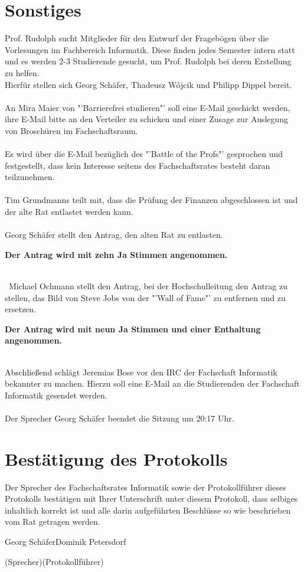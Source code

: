 \documentclass[a4paper, 11pt]{article} %
\newcommand{\TeXer}{Dominik Petersdorf}
\newcommand{\fsiPresident}{Georg Schäfer}
\begin{document}
\section{Sonstiges}

Prof. Rudolph sucht Mitglieder für den Entwurf der Fragebögen über die Vorlesungen im Fachbereich Informatik. 
Diese finden jedes Semester intern statt und es werden 2-3 Studierende gesucht, um Prof. Rudolph bei deren Erstellung zu helfen.
\\
Hierfür stellen sich Georg Schäfer, Thadeusz W{\'o}jcik und Philipp Dippel bereit.
\\\\
An Mira Maier von "'Barrierefrei studieren"' soll eine E-Mail geschickt werden, ihre E-Mail bitte an den Verteiler zu schicken und einer Zusage zur Auslegung von Broschüren im Fachschaftsraum.
\\\\
Es wird über die E-Mail bezüglich des "'Battle of the Profs"' gesprochen und festgestellt, dass kein Interesse seitens des Fachschaftsrates besteht daran teilzunehmen.
\\\\
Tim Grundmanns teilt mit, dass die Prüfung der Finanzen abgeschlossen ist und der alte Rat entlastet werden kann.
\\\\
Georg Schäfer stellt den Antrag, den alten Rat zu entlasten.

\begin{center}
	\textbf{Der Antrag wird mit zehn Ja Stimmen angenommen.}
\end{center}

\ \\\
Michael Ochmann stellt den Antrag, bei der Hochschulleitung den Antrag zu stellen, das Bild von Steve Jobs von der "'Wall of Fame"' zu entfernen und zu ersetzen.

\begin{center}
	\textbf{Der Antrag wird mit neun Ja Stimmen und einer Enthaltung angenommen.}
\end{center}
\ \\
Abschließend schlägt Jeremias Bose vor den IRC der Fachschaft Informatik bekannter zu machen. Hierzu soll eine E-Mail an die Studierenden der Fachschaft Informatik gesendet werden.
\\\\
Der Sprecher Georg Schäfer beendet die Sitzung um 20:17 Uhr.

\section{Bestätigung des Protokolls}
Der Sprecher des Fachschaftsrates Informatik sowie der Protokollführer dieses Protokolls bestätigen mit Ihrer Unterschrift unter diesem Protokoll, dass selbiges inhaltlich korrekt ist und alle darin aufgeführten Beschlüsse so wie beschrieben vom Rat getragen werden.
\\
\vspace{1.5cm}



\vspace{3.5cm}
\hrulefill \hfill \hrulefill

\fsiPresident \hfill \TeXer

{\footnotesize (Sprecher)\hfill (Protokollführer)}
\end{document}
